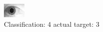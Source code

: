 \begin{figure}[h!]
\begin{center}
\includegraphics[width=0.60\columnwidth]{figures/ID1800_class_4_target_3.png}
\end{center}
\caption{ Classification: 4 actual target: 3}
\label{fig:ID1800_class_4_target_3}
\end{figure}
